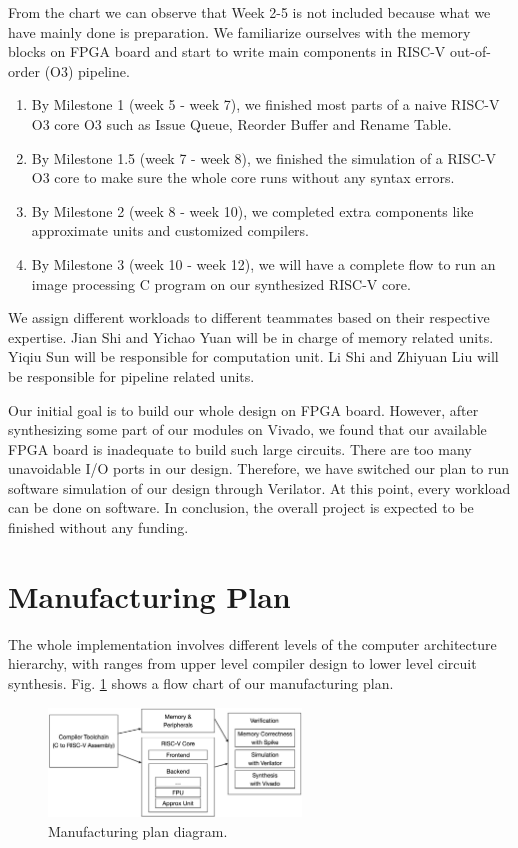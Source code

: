 From the chart we can observe that Week 2-5 is not included because what we have mainly done is preparation. We familiarize ourselves with the memory blocks on FPGA board and start to write main components in RISC-V out-of-order (O3) pipeline.
\begin{enumerate}
    \item By Milestone 1 (week 5 - week 7), we finished most parts of a naive RISC-V O3 core O3 such as Issue Queue, Reorder Buffer and Rename Table.
    \item By Milestone 1.5 (week 7 - week 8), we finished the simulation of a RISC-V O3 core to make sure the whole core runs without any syntax errors.
    \item By Milestone 2 (week 8 - week 10), we completed extra components like approximate units and customized compilers.
    \item By Milestone 3 (week 10 - week 12), we will have a complete flow to run an image processing C program on our synthesized RISC-V core.
\end{enumerate} 

We assign different workloads to different teammates based on their respective expertise. Jian Shi and Yichao Yuan will be in charge of memory related units. Yiqiu Sun will be responsible for computation unit. Li Shi and Zhiyuan Liu will be responsible for pipeline related units.
 
Our initial goal is to build our whole design on FPGA board. However, after synthesizing some part of our modules on Vivado, we found that our available FPGA board is inadequate to build such large circuits. There are too many unavoidable I/O ports in our design. Therefore, we have switched our plan to run software simulation of our design through Verilator. At this point, every workload can be done on software. In conclusion, the overall project is expected to be finished without any funding.


\section{Manufacturing Plan} %
The whole implementation involves different levels of the computer architecture hierarchy, with ranges from upper level compiler design to lower level circuit synthesis. Fig. \ref{fig:implement_plan} shows a flow chart of our manufacturing plan. 

\begin{figure}[!htp]
    \centering
    \includegraphics[width=0.6\textwidth]{figure/implement_plan.png}
    \caption{Manufacturing plan diagram.}
    \label{fig:implement_plan}
\end{figure}

